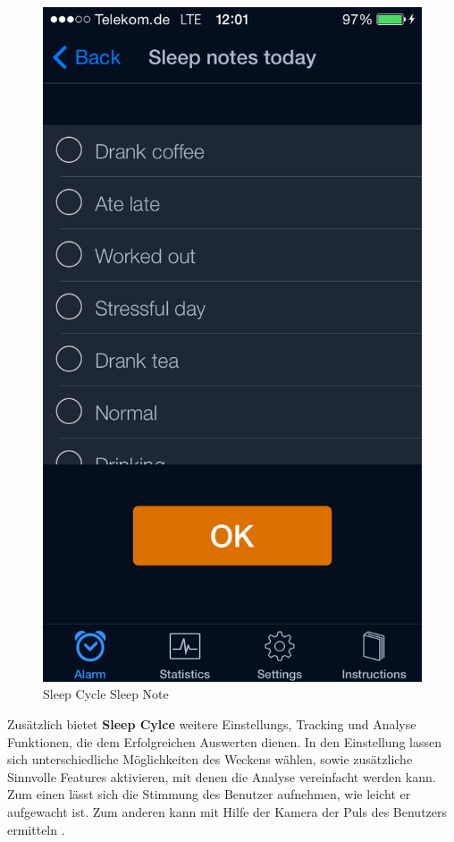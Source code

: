 \begin{figure}[]
\begin{minipage}[b]{0.47\textwidth}
    \includegraphics[scale=0.3]{images/SleepCycle/SleepNotesToday}  
    \caption{Sleep Cycle Sleep Note}
    \label{fig:SCSleepNoteToday}
  \end{minipage}
\end{figure}

Zusätzlich bietet \textbf{Sleep Cylce} weitere Einstellungs, Tracking und Analyse Funktionen, die dem Erfolgreichen Auswerten dienen.
In den Einstellung lassen sich unterschiedliche Möglichkeiten des Weckens wählen, sowie zusätzliche Sinnvolle Features aktivieren, mit denen die Analyse vereinfacht werden kann.
Zum einen lässt sich die Stimmung des Benutzer aufnehmen, wie leicht er aufgewacht ist.
Zum anderen kann mit Hilfe der Kamera der Puls des Benutzers ermitteln \cite{web:Pulsmessen}.

